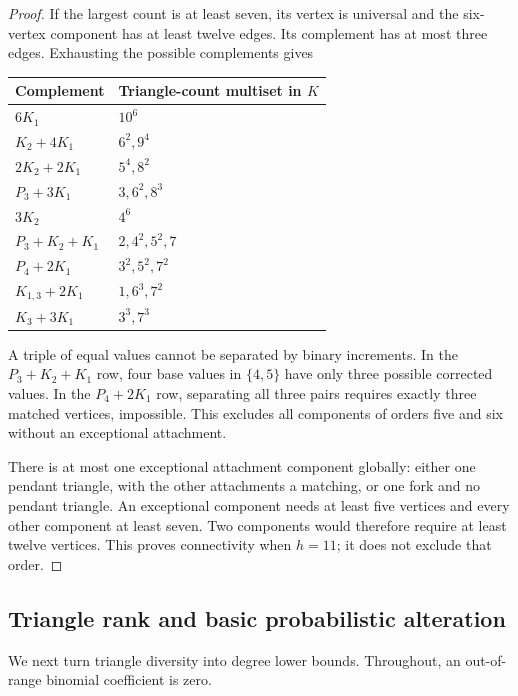 \documentclass[11pt,a4paper]{article}
\theoremstyle{definition}\newtheorem{definition}[theorem]{Definition}
\theoremstyle{remark}\newtheorem{remark}[theorem]{Remark}
\begin{document}
\begin{proof}
If the largest count is at least seven, its vertex is universal and
the six-vertex component has at least twelve edges. Its complement
has at most three edges. Exhausting the possible complements gives
\begin{center}\small
\begin{tabular}{ll}
\toprule
Complement&Triangle-count multiset in $K$\\\midrule
$6K_1$&$10^6$\\
$K_2+4K_1$&$6^2,9^4$\\
$2K_2+2K_1$&$5^4,8^2$\\
$P_3+3K_1$&$3,6^2,8^3$\\
$3K_2$&$4^6$\\
$P_3+K_2+K_1$&$2,4^2,5^2,7$\\
$P_4+2K_1$&$3^2,5^2,7^2$\\
$K_{1,3}+2K_1$&$1,6^3,7^2$\\
$K_3+3K_1$&$3^3,7^3$\\\bottomrule
\end{tabular}
\end{center}
A triple of equal values cannot be separated by binary increments.
In the $P_3+K_2+K_1$ row, four base values in $\{4,5\}$ have only
three possible corrected values. In the $P_4+2K_1$ row, separating
all three pairs requires exactly three matched vertices, impossible.
This excludes all components of orders five and six without an
exceptional attachment.

There is at most one exceptional attachment component globally:
either one pendant triangle, with the other attachments a matching,
or one fork and no pendant triangle. An exceptional component needs
at least five vertices and every other component at least seven.
Two components would therefore require at least twelve vertices.
This proves connectivity when $h=11$; it does not exclude that order.
\end{proof}

\subsection{Triangle rank and basic probabilistic alteration}
\label{paired:rank-section}

We next turn triangle diversity into degree lower bounds. Throughout,
an out-of-range binomial coefficient is zero.
\end{document}
